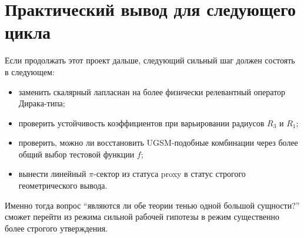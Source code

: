 \documentclass[12pt,a4paper]{article}
\begin{document}
\section{Практический вывод для следующего цикла}

Если продолжать этот проект дальше, следующий сильный шаг должен состоять в следующем:
\begin{itemize}
    \item заменить скалярный лапласиан на более физически релевантный оператор Дирака-типа;
    \item проверить устойчивость коэффициентов при варьировании радиусов \(R_3\) и \(R_1\);
    \item проверить, можно ли восстановить UGSM-подобные комбинации через более общий выбор тестовой функции \(f\);
    \item вынести линейный \(\pi\)-сектор из статуса proxy в статус строгого геометрического вывода.
\end{itemize}

Именно тогда вопрос ``являются ли обе теории тенью одной большой сущности?'' сможет перейти из режима сильной рабочей гипотезы в режим существенно более строгого утверждения.
\end{document}
